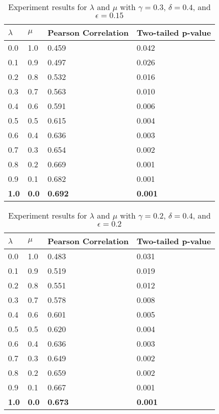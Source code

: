 \documentclass{article}
\begin{document}
\begin{table}[h!]
\caption{Experiment results for $\lambda$ and $\mu$ with $\gamma = 0.3$, $\delta = 0.4$, and $\epsilon = 0.15$}
\centering
\begin{tabular}{llll}
	\toprule
	$\lambda$ & $\mu$ & Pearson Correlation & Two-tailed p-value \\
	\midrule
	0.0 & 1.0 & 0.459 & 0.042 \\
	0.1 & 0.9 & 0.497 & 0.026 \\
	0.2 & 0.8 & 0.532 & 0.016 \\
	0.3 & 0.7 & 0.563 & 0.010 \\
	0.4 & 0.6 & 0.591 & 0.006 \\
	0.5 & 0.5 & 0.615 & 0.004 \\
	0.6 & 0.4 & 0.636 & 0.003 \\
	0.7 & 0.3 & 0.654 & 0.002 \\
	0.8 & 0.2 & 0.669 & 0.001 \\
	0.9 & 0.1 & 0.682 & 0.001 \\
	\textbf{1.0} & \textbf{0.0} & \textbf{0.692} & \textbf{0.001} \\
	\bottomrule
\end{tabular}
\label{table:lambdamuresults1}
\end{table}

\begin{table}[h!]
\caption{Experiment results for $\lambda$ and $\mu$ with $\gamma = 0.2$, $\delta = 0.4$, and $\epsilon = 0.2$}
\centering
\begin{tabular}{llll}
	\toprule
	$\lambda$ & $\mu$ & Pearson Correlation & Two-tailed p-value \\
	\midrule
	0.0 & 1.0 & 0.483 & 0.031 \\
	0.1 & 0.9 & 0.519 & 0.019 \\
	0.2 & 0.8 & 0.551 & 0.012 \\
	0.3 & 0.7 & 0.578 & 0.008 \\
	0.4 & 0.6 & 0.601 & 0.005 \\
	0.5 & 0.5 & 0.620 & 0.004 \\
	0.6 & 0.4 & 0.636 & 0.003 \\
	0.7 & 0.3 & 0.649 & 0.002 \\
	0.8 & 0.2 & 0.659 & 0.002 \\
	0.9 & 0.1 & 0.667 & 0.001 \\
	\textbf{1.0} & \textbf{0.0} & \textbf{0.673} & \textbf{0.001} \\	
	\bottomrule
\end{tabular}
\label{table:lambdamuresults2}
\end{table}
\end{document}

